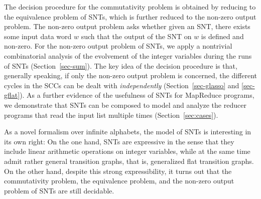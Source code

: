 The decision procedure for the commutativity problem is obtained by reducing to the equivalence problem of SNTs, which is further reduced to the non-zero output problem. The non-zero output problem asks whether given an SNT, there exists some input data word $w$ such that the output of the SNT on $w$ is defined and non-zero.  For the non-zero output problem of SNTs, we apply a nontrivial combinatorial analysis of the evolvement of the integer variables during the runs of SNTs (Section~\ref{sec-sum}). The key idea of the decision procedure is that, generally speaking, if only the non-zero output problem is concerned, the different cycles in the SCCs can be dealt with \emph{independently} (Section~\ref{sec-glasso} and \ref{sec-gflat}). 
%
As a further evidence of the usefulness of SNTs for MapReduce programs, we demonstrate that SNTs can be composed to model and analyze the reducer programs that read the input list multiple times (Section~\ref{sec:cases}). 

As a novel formalism over infinite alphabets, the model of SNTs is interesting in its own right: On the one hand, SNTs are expressive in the sense that they include linear arithmetic operations on integer variables, while at the same time admit rather general transition graphs, that is, generalized flat transition graphs. On the other hand, despite this strong expressibility, it turns out that the commutativity problem, the equivalence problem, and the non-zero output problem of SNTs are still decidable.  

\smallskip

